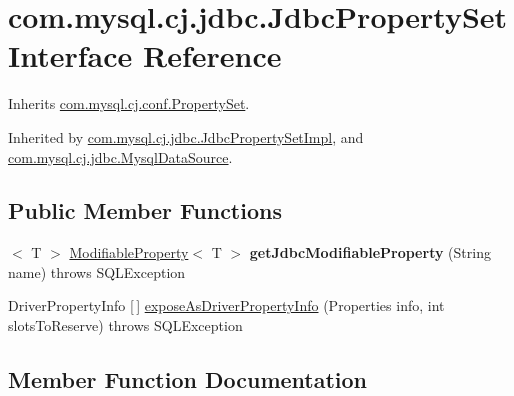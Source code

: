\hypertarget{interfacecom_1_1mysql_1_1cj_1_1jdbc_1_1_jdbc_property_set}{}\section{com.\+mysql.\+cj.\+jdbc.\+Jdbc\+Property\+Set Interface Reference}
\label{interfacecom_1_1mysql_1_1cj_1_1jdbc_1_1_jdbc_property_set}


Inherits \mbox{\hyperlink{interfacecom_1_1mysql_1_1cj_1_1conf_1_1_property_set}{com.\+mysql.\+cj.\+conf.\+Property\+Set}}.



Inherited by \mbox{\hyperlink{classcom_1_1mysql_1_1cj_1_1jdbc_1_1_jdbc_property_set_impl}{com.\+mysql.\+cj.\+jdbc.\+Jdbc\+Property\+Set\+Impl}}, and \mbox{\hyperlink{classcom_1_1mysql_1_1cj_1_1jdbc_1_1_mysql_data_source}{com.\+mysql.\+cj.\+jdbc.\+Mysql\+Data\+Source}}.

\subsection*{Public Member Functions}
\begin{DoxyCompactItemize}
\item 
\mbox{\label{interfacecom_1_1mysql_1_1cj_1_1jdbc_1_1_jdbc_property_set_ab32dd5fed2dd7e715e1d95b0dbc4f587}} 
$<$ T $>$ \mbox{\hyperlink{interfacecom_1_1mysql_1_1cj_1_1conf_1_1_modifiable_property}{Modifiable\+Property}}$<$ T $>$ {\bfseries get\+Jdbc\+Modifiable\+Property} (String name)  throws S\+Q\+L\+Exception
\item 
Driver\+Property\+Info \mbox{[}$\,$\mbox{]} \mbox{\hyperlink{interfacecom_1_1mysql_1_1cj_1_1jdbc_1_1_jdbc_property_set_a3d74db3873b64c6ed704a443e9993359}{expose\+As\+Driver\+Property\+Info}} (Properties info, int slots\+To\+Reserve)  throws S\+Q\+L\+Exception
\end{DoxyCompactItemize}


\subsection{Member Function Documentation}
\mbox{\label{interfacecom_1_1mysql_1_1cj_1_1jdbc_1_1_jdbc_property_set_a3d74db3873b64c6ed704a443e9993359}} 
